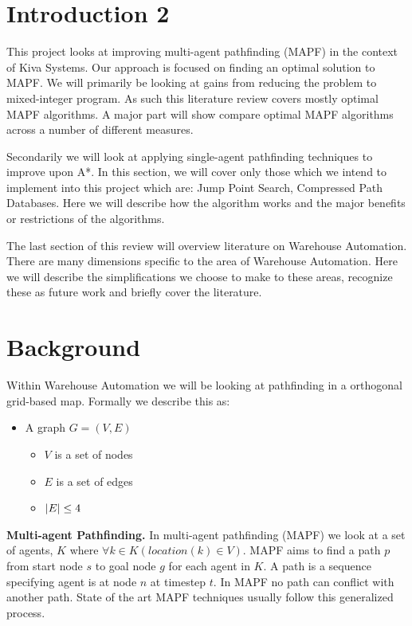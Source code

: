 \documentclass[a4paper,11pt]{article}
\begin{document}
\section{Introduction 2}

This project looks at improving multi-agent pathfinding (MAPF) in the context of Kiva Systems. Our approach is focused on finding an optimal solution to MAPF. We will primarily be looking at gains from reducing the problem to mixed-integer program. As such this literature review covers mostly optimal MAPF algorithms. A major part will show compare optimal MAPF algorithms across a number of different measures.

Secondarily we will look at applying single-agent pathfinding techniques to improve upon A*. In this section, we will cover only those which we intend to implement into this project which are: Jump Point Search, Compressed Path Databases. Here we will describe how the algorithm works and the major benefits or restrictions of the algorithms.

The last section of this review will overview literature on Warehouse Automation. There are many dimensions specific to the area of Warehouse Automation. Here we will describe the simplifications we choose to make to these areas, recognize these as future work and briefly cover the literature.

\section{Background}

Within Warehouse Automation we will be looking at pathfinding in a orthogonal grid-based map. Formally we describe this as:


\begin{itemize}
	\item A graph $G = (V, E)$
	\begin{itemize}
		\item $V$ is a set of nodes
		\item $E$ is a set of edges
		\item $\abs{E} \le 4$
	\end{itemize}
\end{itemize}

\noindent \textbf{Multi-agent Pathfinding.} In multi-agent pathfinding (MAPF) we look at a set of agents, $K$ where $\forall k \in K (location(k) \in V)$. MAPF aims to find a path $p$ from start node $s$ to goal node $g$ for each agent in $K$. A path is a sequence specifying agent is at node $n$ at timestep $t$. In MAPF no path can conflict with another path. State of the art MAPF techniques usually follow this generalized process.
	
\end{document}
